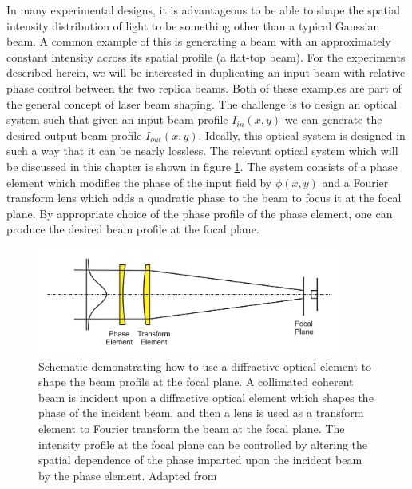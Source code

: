 In many experimental designs, it is advantageous to be able to shape the spatial intensity distribution of light to be something other than a typical Gaussian beam.  A common example of this is generating a beam with an approximately constant intensity across its spatial profile (a flat-top beam).  For the experiments described herein, we will be interested in duplicating an input beam with relative phase control between the two replica beams.  Both of these examples are part of the general concept of laser beam shaping.  The challenge is to design an optical system such that given an input beam profile $I_{in}(x,y)$ we can generate the desired output beam profile $I_{out}(x,y)$. Ideally, this optical system is designed in such a way that it can be nearly lossless.  The relevant optical system which will be discussed in this chapter is shown in figure \ref{fig:beam_shaping_scheme}.  The system consists of a phase element which modifies the phase of the input field by $\phi(x,y)$ and a Fourier transform lens which adds a quadratic phase to the beam to focus it at the focal plane.  By appropriate choice of the phase profile of the phase element, one can produce the desired beam profile at the focal plane.


\begin{figure}
	\centering
	\includegraphics[width=0.9\textwidth]{figures/Two_source/romero_beam_shaping_schematic.png}
	\caption[Schematic of beam shaping using a phase element]{Schematic demonstrating how to use a diffractive optical element to shape the beam profile at the focal plane. A collimated coherent beam is incident upon a diffractive optical element which shapes the phase of the incident beam, and then a lens is used as a transform element to Fourier transform the beam at the focal plane.  The intensity profile at the focal plane can be controlled by altering the spatial dependence of the phase imparted upon the incident beam by the phase element. Adapted from \cite{romeroMathematicalAspectsLaser2010}}
	\label{fig:beam_shaping_scheme}
\end{figure}


